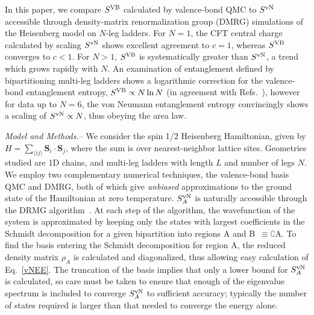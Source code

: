 \documentclass[prl,aps,twocolumn,floatfix,amsmath,amssymb,superscriptaddress,tightenlines]{revtex4}
\begin{document}
 
In this paper, we compare $S^{\rm VB}$ calculated by valence-bond QMC to 
$S^{ \rm vN}$ accessible through density-matrix renormalization group
(DMRG) simulations of the Heisenberg model on $N$-leg ladders.    For $N=1$, the CFT central charge calculated  by scaling
$S^{ \rm vN}$ shows excellent agreement to $c=1$, whereas $S^{\rm VB}$ converges
to $c<1$.
For $N>1$, $S^{\rm VB}$ is systematically greater than $S^{ \rm vN}$,
a trend which grows rapidly with $N$. An
examination of entanglement defined by bipartitioning multi-leg ladders
shows a logarithmic correction for the valence-bond entanglement entropy,
$S^{\rm VB} \propto N \ln
N$ (in agreement with Refs.~\cite{Alet,Chh}), however for data up to
$N=6$, the von Neumann entanglement entropy  convincingly shows a scaling of
$S^{\rm vN} \propto N$, thus obeying the area law.


{\it Model and Methods.}-- We consider the spin 1/2 Heisenberg
Hamiltonian, given by  $H =  \sum_{\langle i j \rangle} {\mathbf S}_i
\cdot {\mathbf S}_j \label{ham}$, where the sum is over nearest-neighbor
lattice sites.  Geometries studied are 1D chains, and multi-leg ladders
with length $L$ and number of legs $N$.  
We employ two complementary numerical techniques, the valence-bond basis
QMC and DMRG, both of which give {\it unbiased} approximations to the
ground state of the Hamiltonian at zero temperature.  $S^{ \rm vN}_A$ is
naturally accessible through the DRMG algorithm~\cite{White92}.  At each
step of the algorithm, the wavefunction of the system is approximated by
keeping only the states with largest coefficients in the Schmidt
decomposition for a given bipartition into regions A and
B~$\equiv\complement$A. To find the basis entering the Schmidt
decomposition for region A, the reduced density matrix $\rho_A$ is
calculated and diagonalized, thus allowing easy calculation of
Eq.~\eqref{vNEE}. The truncation of the basis implies that only a lower
bound for $S^{\rm vN}_A$ is calculated, so care must be taken to ensure
that enough of the eigenvalue spectrum is included to converge $S^{ \rm
vN}_A$ to sufficient accuracy; typically the number of states required is
larger than that needed to converge the energy alone.
\end{document}
